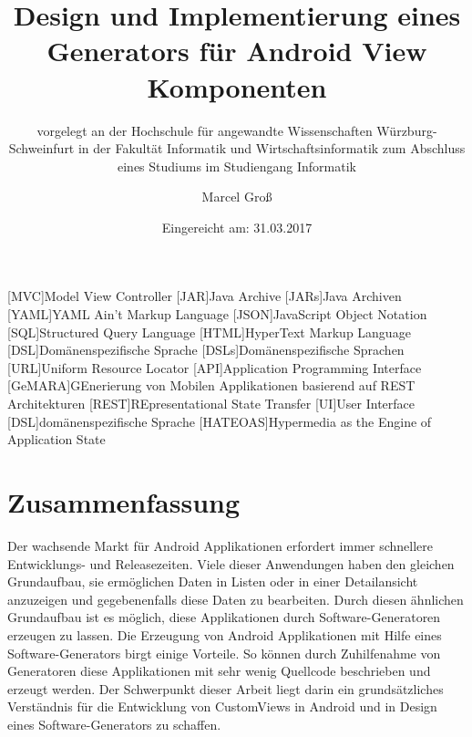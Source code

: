 \documentclass[12pt,oneside,a4paper,parskip]{scrbook}
\def\BaAuthor{Marcel Groß}
\def\BaTitle{Design und Implementierung eines Generators für Android View Komponenten}
\def\BaSupervisorOne{Prof.\ Dr.\ Peter Braun}
\def\BaSupervisorTwo{Prof.\ Dr.\ Steffen Heinzl}
\def\BaDeadline{31.03.2017}
\begin{document}
\begin{acronym}[Bash]
	[MVC]{Model View Controller}
	[JAR]{Java Archive}
	[JARs]{Java Archiven}
	[YAML]{YAML Ain’t Markup Language}
	[JSON]{JavaScript Object Notation}
	[SQL]{Structured Query Language}
	[HTML]{HyperText Markup Language}
	[DSL]{Domänenspezifische Sprache}
	[DSLs]{Domänenspezifische Sprachen}
	[URL]{Uniform Resource Locator}
	[API]{Application Programming Interface}
	[GeMARA]{GEnerierung von Mobilen Applikationen basierend auf REST Architekturen}
	[REST]{REpresentational State Transfer}
	[UI]{User Interface}
	[DSL]{domänenspezifische Sprache}
	[HATEOAS]{Hypermedia as the Engine of Application State}
\end{acronym}


\frontmatter
\titlehead{%
  {Hochschule für angewandte Wissenschaften Würzburg-Schweinfurt\\
   Fakultät Informatik und Wirtschaftsinformatik}}
\subject{Bachelorarbeit}
\title{\BaTitle\\[15mm]}
\subtitle{\normalsize{vorgelegt an der Hochschule f\"{u}r angewandte Wissenschaften W\"{u}rzburg-Schweinfurt in der Fakult\"{a}t Informatik und Wirtschaftsinformatik zum Abschluss eines Studiums im Studiengang Informatik}}
\author{\BaAuthor}
\date{\normalsize{Eingereicht am: \BaDeadline}}
\publishers{
  \normalsize{Erstpr\"{u}fer: \BaSupervisorOne}\\
  \normalsize{Zweitpr\"{u}fer: \BaSupervisorTwo}\\
}


\maketitle



\section*{Zusammenfassung}
Der wachsende Markt für Android Applikationen erfordert immer schnellere Entwicklungs- und Releasezeiten. Viele dieser Anwendungen haben den gleichen Grundaufbau, sie ermöglichen Daten in Listen oder in einer Detailansicht anzuzeigen und gegebenenfalls diese Daten zu bearbeiten. Durch diesen ähnlichen Grundaufbau ist es möglich, diese Applikationen durch Software-Generatoren erzeugen zu lassen.
Die Erzeugung von Android Applikationen mit Hilfe eines Software-Generators birgt einige Vorteile. So können durch Zuhilfenahme von Generatoren diese Applikationen mit sehr wenig Quellcode beschrieben und erzeugt werden. Der Schwerpunkt dieser Arbeit liegt darin ein grundsätzliches Verständnis für die Entwicklung von CustomViews in Android und in Design eines Software-Generators zu schaffen.
\end{document}
